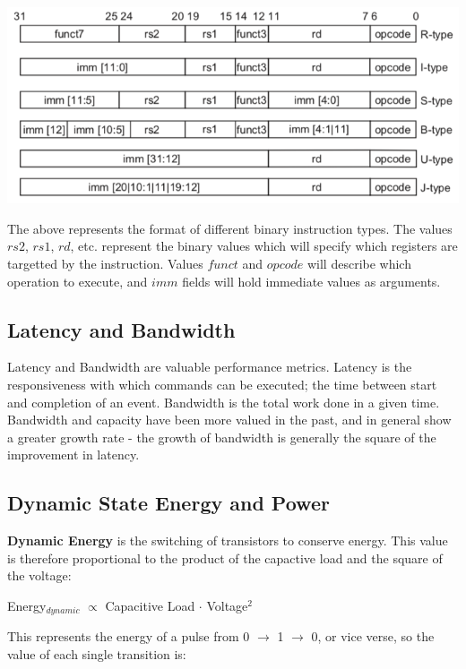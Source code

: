 \documentclass[11pt]{article}
\begin{document}
\begin{center}
    \includegraphics[scale=0.5]{riscv_formats}
\end{center}

The above represents the format of different binary instruction types. The values $rs2$, $rs1$, $rd$, etc. represent the binary values which will specify which registers are targetted by the instruction. Values $funct$ and $opcode$ will describe which operation to execute, and $imm$ fields will hold immediate values as arguments. 

\subsection{Latency and Bandwidth}

Latency and Bandwidth are valuable performance metrics. Latency is the responsiveness with which commands can be executed; the time between start and completion of an event. Bandwidth is the total work done in a given time. Bandwidth and capacity have been more valued in the past, and in general show a greater growth rate - the growth of bandwidth is generally the square of the improvement in latency.

\subsection{Dynamic State Energy and Power}

\textbf{Dynamic Energy} is the switching of transistors to conserve energy. This value is therefore proportional to the product of the capactive load and the square of the voltage:

\begin{center}
    Energy$_{dynamic}$ $\propto$ Capacitive Load $\cdot$ Voltage$^2$
\end{center}

This represents the energy of a pulse from 0 $\rightarrow$ 1 $\rightarrow$ 0, or vice verse, so the value of each single transition is:
\end{document}
